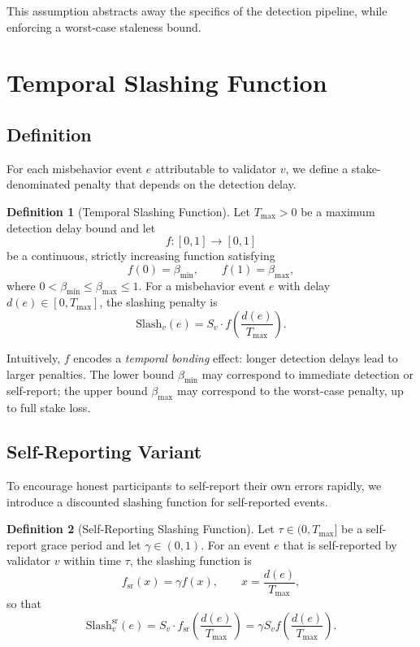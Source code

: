 \documentclass[11pt]{article}
\theoremstyle{plain}
\theoremstyle{definition}
\newtheorem{definition}{Definition}
\begin{document}
This assumption abstracts away the specifics of the detection pipeline, while enforcing a worst-case staleness bound.

\section{Temporal Slashing Function}

\subsection{Definition}

For each misbehavior event \(e\) attributable to validator \(v\), we define a stake-denominated penalty that depends on the detection delay.

\begin{definition}[Temporal Slashing Function]
Let \(T_{\max} > 0\) be a maximum detection delay bound and let
\[
f : [0,1] \to [0,1]
\]
be a continuous, strictly increasing function satisfying
\[
f(0) = \beta_{\min}, \qquad f(1) = \beta_{\max},
\]
where \(0 < \beta_{\min} \le \beta_{\max} \le 1\).
For a misbehavior event \(e\) with delay \(d(e) \in [0,T_{\max}]\), the slashing penalty is
\[
\mathrm{Slash}_v(e) = S_v \cdot f\!\left(\frac{d(e)}{T_{\max}}\right).
\]
\end{definition}

Intuitively, \(f\) encodes a \emph{temporal bonding} effect: longer detection delays lead to larger penalties. The lower bound \(\beta_{\min}\) may correspond to immediate detection or self-report; the upper bound \(\beta_{\max}\) may correspond to the worst-case penalty, up to full stake loss.

\subsection{Self-Reporting Variant}

To encourage honest participants to self-report their own errors rapidly, we introduce a discounted slashing function for self-reported events.

\begin{definition}[Self-Reporting Slashing Function]
Let \(\tau \in (0,T_{\max}]\) be a self-report grace period and let \(\gamma \in (0,1)\). For an event \(e\) that is self-reported by validator \(v\) within time \(\tau\), the slashing function is
\[
f_{\mathrm{sr}}(x) = \gamma f(x), \qquad x = \frac{d(e)}{T_{\max}},
\]
so that
\[
\mathrm{Slash}^{\mathrm{sr}}_v(e) = S_v \cdot f_{\mathrm{sr}}\!\left(\frac{d(e)}{T_{\max}}\right) = \gamma S_v f\!\left(\frac{d(e)}{T_{\max}}\right).
\]
\end{definition}
\end{document}
